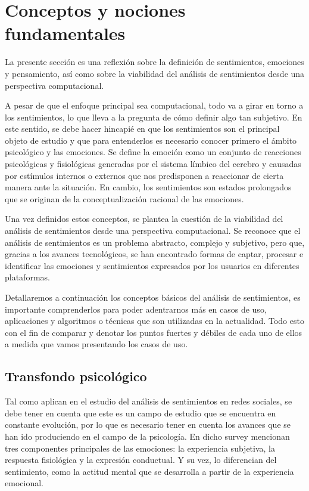 \documentclass[12pt, conference]{IEEEtran}
\begin{document}
\section{Conceptos y nociones fundamentales}
La presente sección es una reflexión sobre la definición de sentimientos, emociones y pensamiento, así como sobre la viabilidad del análisis de sentimientos desde una perspectiva computacional.

A pesar de que el enfoque principal sea computacional, todo va a girar en torno a los sentimientos, lo que lleva a la pregunta de cómo definir algo tan subjetivo. 
En este sentido, se debe hacer hincapié en que los sentimientos son el principal objeto de estudio y que para entenderlos es necesario conocer primero el ámbito psicológico y las emociones. 
Se define la emoción como un conjunto de reacciones psicológicas y fisiológicas generadas por el sistema límbico del cerebro y causadas por estímulos internos o externos que nos predisponen a reaccionar de cierta manera ante la situación. 
En cambio, los sentimientos son estados prolongados que se originan de la conceptualización racional de las emociones.

Una vez definidos estos conceptos, se plantea la cuestión de la viabilidad del análisis de sentimientos desde una perspectiva computacional. 
Se reconoce que el análisis de sentimientos es un problema abstracto, complejo y subjetivo, pero que, gracias a los avances tecnológicos, se han encontrado formas de captar, procesar e identificar las emociones y sentimientos expresados por los usuarios en diferentes plataformas. 

Detallaremos a continuación los conceptos básicos del análisis de sentimientos, es importante comprenderlos para poder adentrarnos más en casos de uso, aplicaciones y algoritmos o técnicas que son utilizadas en la actualidad. Todo esto con el fin de comparar y denotar los puntos fuertes y débiles de cada uno de ellos a medida que vamos presentando los casos de uso.

\subsection{Transfondo psicológico}
Tal como aplican en el estudio \cite{b1} del análisis de sentimientos en redes sociales, se debe tener en cuenta que este es un campo de estudio que se encuentra en constante evolución, por lo que es necesario tener en cuenta los avances que se han ido produciendo en el campo de la psicología. En dicho survey mencionan tres componentes principales de las emociones: la experiencia subjetiva, la respuesta fisiológica y la expresión conductual. Y su vez, lo diferencian del sentimiento, como la actitud mental que se desarrolla a partir de la experiencia emocional.
\end{document}
